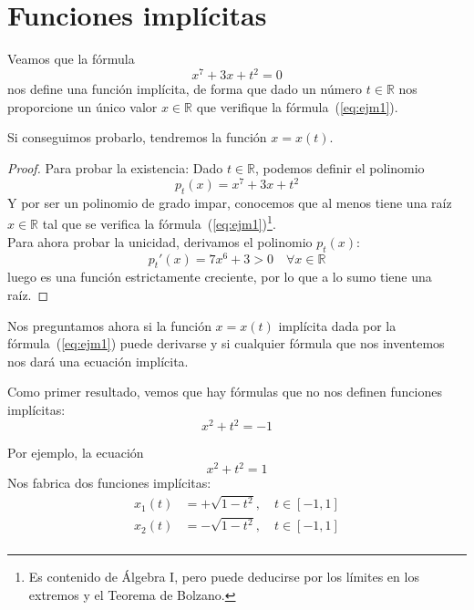 \section{Funciones implícitas}
\begin{ejemplo}
    Veamos que la fórmula
    \begin{equation}\label{eq:ejm1}
        x^7+3x+t^2 = 0
    \end{equation}
    nos define una función implícita, de forma que dado un número $t\in \mathbb{R}$ nos proporcione un único valor $x\in \mathbb{R}$ que verifique la fórmula~(\ref{eq:ejm1}).

    Si conseguimos probarlo, tendremos la función $x=x(t)$.

    \begin{proof}
        Para probar la existencia:\newline
        Dado $t\in \mathbb{R}$, podemos definir el polinomio
        \begin{equation*}
            p_t(x) = x^7+3x+t^2
        \end{equation*}
        Y por ser un polinomio de grado impar, conocemos que al menos tiene una raíz $x\in \mathbb{R}$ tal que se verifica la fórmula~(\ref{eq:ejm1})\footnote{Es contenido de Álgebra I, pero puede deducirse por los límites en los extremos y el Teorema de Bolzano.}.\\

        \noindent
        Para ahora probar la unicidad, derivamos el polinomio $p_t(x)$:
        \begin{equation*}
            p_t'(x) = 7x^6+3 > 0 \quad \forall x\in \mathbb{R}
        \end{equation*}
        luego es una función estrictamente creciente, por lo que a lo sumo tiene una raíz.
    \end{proof}
\end{ejemplo}

Nos preguntamos ahora si la función $x=x(t)$ implícita dada por la fórmula~(\ref{eq:ejm1}) puede derivarse y si cualquier fórmula que nos inventemos nos dará una ecuación implícita.

Como primer resultado, vemos que hay fórmulas que no nos definen funciones implícitas:
\begin{equation*}
    x^2+t^2 = -1
\end{equation*}

Por ejemplo, la ecuación
\begin{equation*}
    x^2+t^2 = 1
\end{equation*}
Nos fabrica dos funciones implícitas:
\begin{align*}
    x_1(t) &= +\sqrt{1-t^2}, \quad t\in [-1,1] \\
    x_2(t) &= -\sqrt{1-t^2}, \quad t\in [-1,1] \\
\end{align*}


